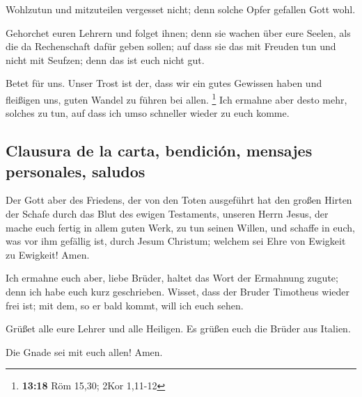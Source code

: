  Wohlzutun und mitzuteilen vergesset nicht; denn solche
Opfer gefallen Gott wohl.

 Gehorchet euren Lehrern und folget ihnen; denn sie
wachen über eure Seelen, als die da Rechenschaft dafür geben sollen; auf
dass sie das mit Freuden tun und nicht mit Seufzen; denn das ist euch
nicht gut.

 Betet für uns. Unser Trost ist der, dass wir ein gutes
Gewissen haben und fleißigen uns, guten Wandel zu führen bei allen.
\footnote{\textbf{13:18} Röm 15,30; 2Kor 1,11-12}  Ich
ermahne aber desto mehr, solches zu tun, auf dass ich umso schneller
wieder zu euch komme.

\hypertarget{clausura-de-la-carta-bendiciuxf3n-mensajes-personales-saludos}{%
\subsection{Clausura de la carta, bendición, mensajes personales,
saludos}\label{clausura-de-la-carta-bendiciuxf3n-mensajes-personales-saludos}}

 Der Gott aber des Friedens, der von den Toten ausgeführt
hat den großen Hirten der Schafe durch das Blut des ewigen Testaments,
unseren Herrn Jesus,  der mache euch fertig in allem
guten Werk, zu tun seinen Willen, und schaffe in euch, was vor ihm
gefällig ist, durch Jesum Christum; welchem sei Ehre von Ewigkeit zu
Ewigkeit! Amen.

 Ich ermahne euch aber, liebe Brüder, haltet das Wort der
Ermahnung zugute; denn ich habe euch kurz geschrieben. 
Wisset, dass der Bruder Timotheus wieder frei ist; mit dem, so er bald
kommt, will ich euch sehen.

 Grüßet alle eure Lehrer und alle Heiligen. Es grüßen
euch die Brüder aus Italien.

 Die Gnade sei mit euch allen! Amen.
